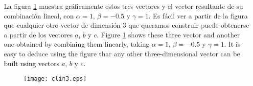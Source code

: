 \begin{paracol}{2}
La figura \ref{fig:clin3} muestra gráficamente estos tres vectores y el vector resultante de su combinación lineal, con $\alpha=1$, $\beta=-0.5$ y $\gamma=1$.  Es fácil ver a partir de la figura que cualquier otro vector de dimensión $3$ que queramos construir puede obtenerse a partir de los vectores $a$, $b$ y $c$.
\switchcolumn
Figure \ref{fig:clin3} shows these three vector and another one obtained by combining them linearly, taking $\alpha=1$, $\beta=-0.5$ y $\gamma=1$. It is easy to deduce using the figure thar any other three-dimensional vector can be built using vectors $a$, $b$ y $c$.
\end{paracol}

\begin{figure}
\centering
\texttt{[image: clin3.eps]}
\label{fig:clin3}
\end{figure}

